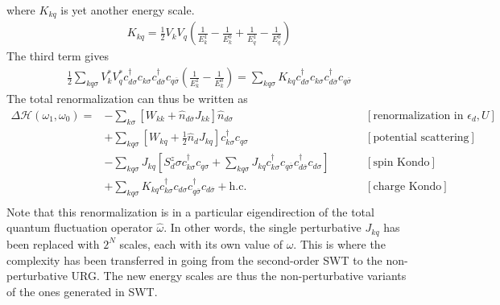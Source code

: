 \documentclass[twoside]{report}
\numberwithin{equation}{section}
\begin{document}
where \(K_{kq}\) is yet another energy scale.
\begin{equation}\begin{aligned}
	K_{kq} = \frac{1}{2}V_k V_q\left(\frac{1}{E_k^1} - \frac{1}{E_k^0} + \frac{1}{E_q^1} - \frac{1}{E_q^0}\right)
\end{aligned}\end{equation}
The third term gives
\begin{equation}\begin{aligned}
	\frac{1}{2}\sum_{kq\sigma}V^*_k V_q^* c^\dagger_{d\sigma}c_{k\sigma} c^\dagger_{d\overline\sigma}c_{q\overline\sigma}\left(\frac{1}{E_k^1} - \frac{1}{E_k^0}\right) = \sum_{kq\sigma} K_{kq}c^\dagger_{d\sigma}c_{k\sigma} c^\dagger_{d\overline\sigma}c_{q\overline\sigma}
\end{aligned}\end{equation}
The total renormalization can thus be written as
\begin{equation}\begin{aligned}
	\Delta \mathcal{H}(\omega_1,\omega_0) =& - \sum_{k\sigma}\left[W_{kk} + \hat n_{d\overline\sigma}J_{kk}\right]\hat n_{d\sigma} &&&& \left[\text{renormalization in \(\epsilon_d, U\)}\right]\\
					       &+ \sum_{kq\sigma}\left[W_{kq} + \frac{1}{2} \hat n_d J_{kq}\right]c^\dagger_{k\sigma}c_{q\sigma} &&&& \left[\text{potential scattering}\right]\\
					       &- \sum_{kq\sigma}J_{kq}\left[S_d^z \sigma c^\dagger_{k\sigma}c_{q\sigma} + \sum_{kq\sigma}J_{kq} c^\dagger_{k\sigma}c_{q\overline\sigma}c^\dagger_{d\overline\sigma}c_{d\sigma}\right]  &&&& \left[\text{spin Kondo}\right]\\
					       &+ \sum_{kq\sigma}K_{kq}c^\dagger_{k\sigma}c_{d\sigma} c^\dagger_{q\overline\sigma}c_{d\overline\sigma} + \text{h.c.} &&&& \left[\text{charge Kondo}\right]\\
\end{aligned}\end{equation}
Note that this renormalization is in a particular eigendirection of the total quantum fluctuation operator \(\hat \omega\). In other words, the single perturbative \(J_{kq}\) has been replaced with \(2^N\) scales, each with its own value of \(\omega\). This is where the complexity has been transferred in going from the second-order SWT to the non-perturbative URG. The new energy scales are thus the non-perturbative variants of the ones generated in SWT.
\end{document}
